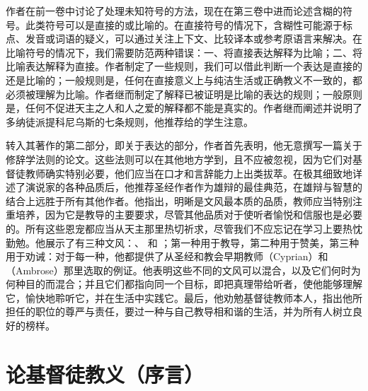  作者在前一卷中讨论了处理未知符号的方法，现在在第三卷中进而论述含糊的符号。此类符号可以是直接的或比喻的。在直接符号的情况下，含糊性可能源于标点、发音或词语的疑义，可以通过关注上下文、比较译本或参考原语言来解决。在比喻符号的情况下，我们需要防范两种错误：一、将直接表达解释为比喻；二、将比喻表达解释为直接。作者制定了一些规则，我们可以借此判断一个表达是直接的还是比喻的；一般规则是，任何在直接意义上与纯洁生活或正确教义不一致的，都必须被理解为比喻。作者继而制定了解释已被证明是比喻的表达的规则；一般原则是，任何不促进天主之人和人之爱的解释都不能是真实的。作者继而阐述并说明了多纳徒派提科尼乌斯的七条规则，他推荐给的学生注意。\par

 \newline{}  \newline{} 转入其著作的第二部分，即关于表达的部分，作者首先表明，他无意撰写一篇关于修辞学法则的论文。这些法则可以在其他地方学到，且不应被忽视，因为它们对基督徒教师确实特别必要，他们应当在口才和言辞能力上出类拔萃。在极其细致地详述了演说家的各种品质后，他推荐圣经作者作为雄辩的最佳典范，在雄辩与智慧的结合上远胜于所有其他作者。他指出，明晰是文风最本质的品质，教师应当特别注重培养，因为它是教导的主要要求，尽管其他品质对于使听者愉悦和信服也是必要的。所有这些恩宠都应当从天主那里热切祈求，尽管我们不应忘记在学习上要热忱勤勉。他展示了有三种文风：、 和 ；第一种用于教导，第二种用于赞美，第三种用于劝诫：对于每一种，他都提供了从圣经和教会早期教师（Cyprian）和（Ambrose）那里选取的例证。他表明这些不同的文风可以混合，以及它们何时为何种目的而混合；并且它们都指向同一个目标，即把真理带给听者，使他能够理解它，愉快地聆听它，并在生活中实践它。最后，他劝勉基督徒教师本人，指出他所担任的职位的尊严与责任，要过一种与自己教导相和谐的生活，并为所有人树立良好的榜样。\par



\section{论基督徒教义（序言）}

